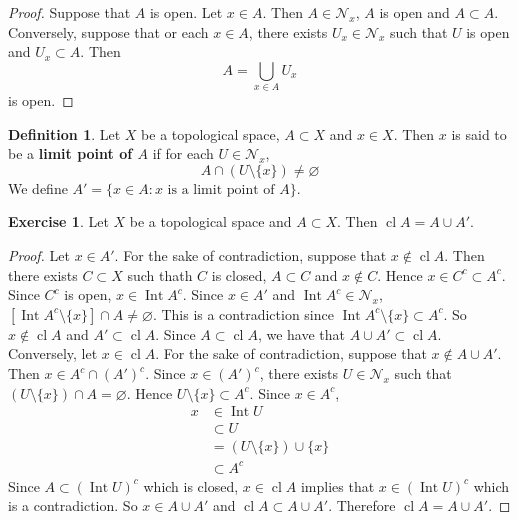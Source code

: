 \documentclass[12pt]{amsart}
\theoremstyle{definition}
\newtheorem{defn}[definition]{Definition}
\newtheorem{ex}[definition]{Exercise}
\newcommand{\MN}{\mathcal{N}}
\newcommand{\tbf}[1]{\textbf{#1}}
\DeclareMathOperator{\cl}{cl}
\DeclareMathOperator{\Int}{Int}
\DeclareMathOperator*{\0}{\mbf{0}}
\DeclareMathOperator*{\1}{\mbf{1}}
\newcommand{\lex}[1]{\label{ex:#1}}
\newcommand{\ld}[1]{\label{defn:#1}}
\begin{document}
	\begin{proof}
	Suppose that $A$ is open. Let $x \in A$. Then $A \in \MN_x$, $A$ is open and $A \subset A$. Conversely, suppose that or each $x \in A$, there exists $U_x \in \MN_x$ such that $U$ is open and $U_x \subset A$. Then $$A = \bigcup\limits_{x \in A}U_x$$ is open. 
	\end{proof}
	
	\begin{defn} \ld{31018}
	Let $X$ be a topological space, $A \subset X$ and $x \in X$. Then $x$ is said to be a \tbf{limit point of $A$} if for each $U \in \MN_x$, $$A \cap (U \setminus \{x\}) \neq \varnothing$$  
	We define $A' = \{x \in A: \text{$x$ is a limit point of $A$}\}$.
	\end{defn}
	
	\begin{ex} \lex{31019}
	Let $X$ be a topological space and $A \subset X$. Then $\cl A = A \cup A'$. 
	\end{ex}	
	
	\begin{proof}
	Let $x \in A'$. For the sake of contradiction, suppose that $x \not \in \cl A$. Then there exists $C \subset X$ such thath $C$ is closed, $A \subset C$ and $x \not \in C$. Hence $x \in C^c \subset A^c$. Since $C^c$ is open, $x \in \Int A^c$. Since $x \in A'$ and $\Int A^c \in \MN_x$, $[\Int A^c \setminus \{x\}] \cap A \neq \varnothing$. This is a contradiction since $\Int A^c \setminus \{x\} \subset A^c$. So $x \not \in \cl A$ and $A' \subset \cl A$. Since $A \subset \cl A$, we have that $A \cup A' \subset \cl A $.\\ Conversely, let $x \in \cl A$. For the sake of contradiction, suppose that $x \not \in A \cup A'$. Then $x \in A^c \cap (A')^c$. Since $x \in (A')^c$, there exists $U \in \MN_x$ such that $(U \setminus \{x\}) \cap A = \varnothing$. Hence $U \setminus \{x\} \subset A^c$. Since $x \in A^c$, 
	\begin{align*}
	x
	& \in \Int U \\
	& \subset U \\ 
	&= (U \setminus \{x\}) \cup \{x\} \\
	& \subset A^c
\end{align*}	
	Since $A \subset (\Int U)^c$ which is closed, $x \in \cl A$ implies that $x \in (\Int U)^c$ which is a contradiction. So $x \in A \cup A'$ and $\cl A \subset A \cup A'$. Therefore $\cl A = A \cup A'$.
	\end{proof}
	
	
	
\end{document}
